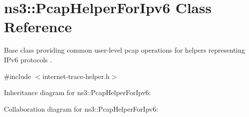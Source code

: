\hypertarget{classns3_1_1PcapHelperForIpv6}{}\section{ns3\+:\+:Pcap\+Helper\+For\+Ipv6 Class Reference}
\label{classns3_1_1PcapHelperForIpv6}


Base class providing common user-\/level pcap operations for helpers representing I\+Pv6 protocols .  




{\ttfamily \#include $<$internet-\/trace-\/helper.\+h$>$}



Inheritance diagram for ns3\+:\+:Pcap\+Helper\+For\+Ipv6\+:


Collaboration diagram for ns3\+:\+:Pcap\+Helper\+For\+Ipv6\+:
